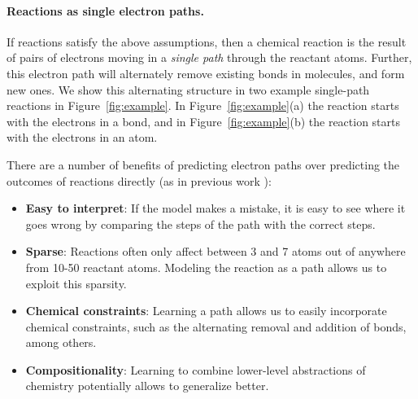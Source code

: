 \paragraph{Reactions as single electron paths.}
If reactions satisfy the above assumptions, then a chemical reaction is the result of pairs of electrons moving in a \emph{single path} through the reactant atoms. Further, this electron path will alternately remove existing bonds in molecules, and form new ones. We show this alternating structure in two example single-path reactions in Figure~\ref{fig:example}. In Figure~\ref{fig:example}(a) the reaction starts with the electrons in a bond, and in Figure~\ref{fig:example}(b) the reaction starts with the electrons in an atom. 

There are a number of benefits of predicting electron paths over predicting the outcomes of reactions directly (as in previous work \cite{jin2017predicting,schwaller2017found}):
\begin{itemize}
\item \textbf{Easy to interpret}: If the model makes a mistake, it is easy to see where it goes wrong by comparing the steps of the path with the correct steps.
\item \textbf{Sparse}: Reactions often only affect between 3 and 7 atoms out of anywhere from 10-50 reactant atoms. Modeling the reaction as a path allows us to exploit this sparsity.
\item \textbf{Chemical constraints}: Learning a path allows us to easily incorporate chemical constraints, such as the alternating removal and addition of bonds, among others.
\item \textbf{Compositionality}: Learning to combine lower-level abstractions of chemistry potentially allows to generalize better.
\end{itemize}